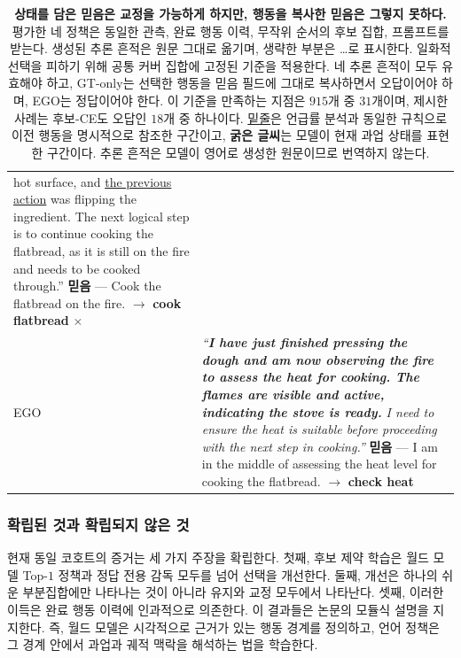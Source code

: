 \documentclass[letterpaper]{article}
\newcommand{\obs}[1]{\textcolor{measuredblue}{#1}}
\newcommand{\method}{\textsc{EGO}}
\newcommand{\cmark}{\checkmark}
\begin{document}
\begin{table}[t]
\begin{tabular}{@{}p{}p{}@{}}
{    hot surface, and \underline{the previous action} was flipping the
    ingredient. The next logical step is to continue cooking the flatbread, as
    it is still on the fire and needs to be cooked through.''}
    \newline
    \textbf{믿음} --- Cook the flatbread on the fire.
    \newline
    $\rightarrow$ \textbf{cook flatbread} $\times$
    \quad{\scriptsize[``shows''를 통한 장면 묘사]} \\
\method{}
  & \emph{``\textbf{I have just finished pressing the dough and am now
    observing the fire to assess the heat for cooking. The flames are visible
    and active, indicating the stove is ready.} I need to ensure the heat is
    suitable before proceeding with the next step in cooking.''}
    \newline
    \textbf{믿음} --- I am in the middle of assessing the heat level for
    cooking the flatbread.
    \newline
    $\rightarrow$ \textbf{check heat} \cmark
    \quad{\scriptsize[상태를 담은 믿음, 이전 행동에 대한 명시적 언급 없음]} \\
\bottomrule
\end{tabular}
\caption{\textbf{상태를 담은 믿음은 교정을 가능하게 하지만, 행동을 복사한
믿음은 그렇지 못하다.} 평가한 네 정책은 동일한 관측, 완료 행동 이력, 무작위
순서의 후보 집합, 프롬프트를 받는다. 생성된 추론 흔적은 원문 그대로 옮기며,
생략한 부분은 \ldots{}로 표시한다. 일화적 선택을 피하기 위해 공통 커버 집합에
고정된 기준을 적용한다. 네 추론 흔적이 모두 유효해야 하고, GT-only는 선택한
행동을 믿음 필드에 그대로 복사하면서 오답이어야 하며, \method{}는 정답이어야
한다. 이 기준을 만족하는 지점은 \obs{$915$}개 중 \obs{$31$}개이며, 제시한
사례는 후보-CE도 오답인 \obs{$18$}개 중 하나이다.
\underline{밑줄}은 언급률 분석과 동일한 규칙으로 이전 행동을 명시적으로 참조한
구간이고, \textbf{굵은 글씨}는 모델이 현재 과업 상태를 표현한 구간이다.
추론 흔적은 모델이 영어로 생성한 원문이므로 번역하지 않는다.}
\label{tab:trace-echo}
\end{table}

\subsubsection{확립된 것과 확립되지 않은 것}
\label{sec:er-scope}

현재 동일 코호트의 증거는 세 가지 주장을 확립한다. 첫째, 후보 제약 학습은 월드
모델 Top-\obs{$1$} 정책과 정답 전용 감독 모두를 넘어 선택을 개선한다. 둘째,
개선은 하나의 쉬운 부분집합에만 나타나는 것이 아니라 유지와 교정 모두에서
나타난다. 셋째, 이러한 이득은 완료 행동 이력에 인과적으로 의존한다. 이 결과들은
논문의 모듈식 설명을 지지한다. 즉, 월드 모델은 시각적으로 근거가 있는 행동
경계를 정의하고, 언어 정책은 그 경계 안에서 과업과 궤적 맥락을 해석하는 법을
학습한다.
\end{document}
